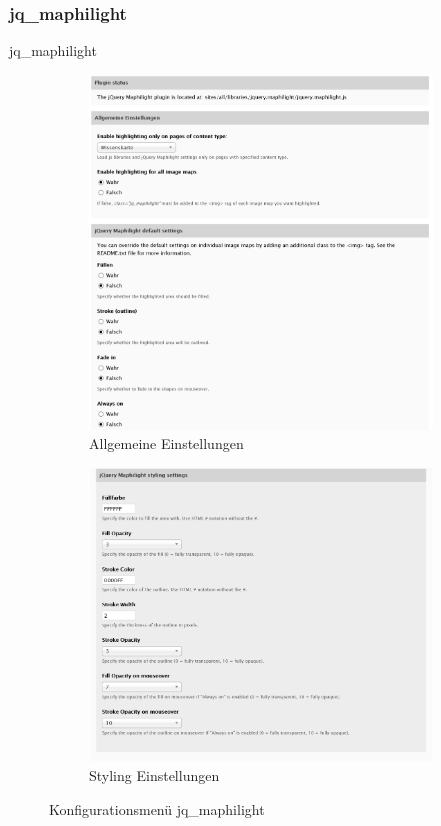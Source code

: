 \subsubsection{jq\_maphilight}\label{subsub:maphilight}
jq\_maphilight
\begin{figure}[H]
	\centering
	\begin{subfigure}[a]{0.4\textwidth}
		\centering
		\includegraphics[height=0.20\textheight]{images/config_maphilight1}
		\caption[]{Allgemeine Einstellungen}
		\label{fig:config_maphilight1}
	\end{subfigure}
	\begin{subfigure}[A]{0.4\textwidth}
		\centering
		\includegraphics[height=0.20\textheight]{images/config_maphilight2}
		\caption[]{Styling Einstellungen}
		\label{fig:config_maphilight2}
	\end{subfigure}
	\caption[]{Konfigurationsmenü jq\_maphilight}
	\label{fig:config_maphilight}
\end{figure}




